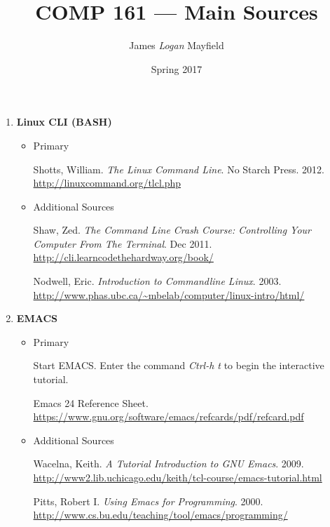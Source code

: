 \documentclass[10pt]{article}
\title{COMP 161 --- Main Sources}
\author{ James \textit{Logan} Mayfield }
\date{Spring 2017}
\begin{document}
\maketitle

\begin{enumerate}
\item \textbf{Linux CLI (BASH)}
\begin{itemize}
\item Primary

Shotts, William. \textit{The Linux Command Line}. No Starch Press. 2012.
\newline \url{http://linuxcommand.org/tlcl.php}

\vspace{.25in}

\item Additional Sources

Shaw, Zed. \textit{The Command Line Crash Course: Controlling Your Computer From The Terminal}. Dec 2011.
\newline \url{http://cli.learncodethehardway.org/book/}

\vspace{.25in}

Nodwell, Eric. \textit{Introduction to Commandline Linux}. 2003.
\newline \url{http://www.phas.ubc.ca/~mbelab/computer/linux-intro/html/}
\vspace{.25in}
\end{itemize}

\item \textbf{EMACS}
\begin{itemize}
\item Primary

Start EMACS\@. Enter the command \textit{Ctrl-h t} to begin the interactive tutorial.
\vspace{.25in}

Emacs 24 Reference Sheet. \newline
\url{https://www.gnu.org/software/emacs/refcards/pdf/refcard.pdf}
\vspace{.25in}

\item Additional Sources

Wacelna, Keith. \textit{A Tutorial Introduction to GNU Emacs}. 2009.
\newline \url{http://www2.lib.uchicago.edu/keith/tcl-course/emacs-tutorial.html}
\vspace{.25in}

Pitts, Robert I. \textit{Using Emacs for Programming}. 2000.
\newline \url{http://www.cs.bu.edu/teaching/tool/emacs/programming/}
\vspace{.25in}


\end{itemize}
\end{enumerate}
\end{document}
